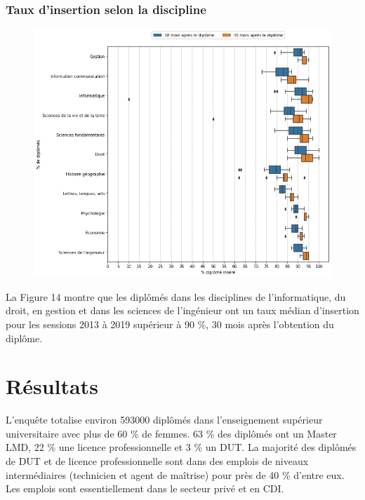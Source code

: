 \documentclass[12pt, a4paper, titlepage, table]{article}
\begin{document}
	\subsubsection{Taux d'insertion selon la discipline}
	
		\begin{figure}[H]
			\centering
			\includegraphics[width=1\textwidth]{../graphs/boxplot_insertion_discipline.png}
			\label{fig:boxplot_insertion_discipline}
		\end{figure}
		
	La Figure 14 montre que les diplômés dans les disciplines de l'informatique, du droit, en gestion et dans les sciences de l'ingénieur ont un taux médian d'insertion pour les sessions 2013 à 2019 supérieur à 90 \%, 30 mois après l'obtention du diplôme. 
	
\section{Résultats}
L'enquête totalise environ 593000 diplômés dans l'enseignement supérieur universitaire avec plus de 60 \% de femmes.
63 \% des diplômés ont un Master LMD, 22 \% une licence professionnelle et 3 \% un DUT.
La majorité des diplômés de DUT et de licence professionnelle sont dans des emplois de niveaux intermédiaires (technicien et agent de maîtrise) pour près de 40 \% d'entre eux. Les emplois sont essentiellement dans le secteur privé et en CDI.
\end{document}

